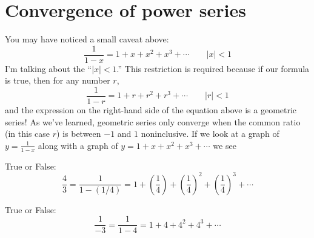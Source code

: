 \documentclass{ximera}
\begin{document}
\section{Convergence of power series}

You may have noticed a small caveat above:
\[
\frac{1}{1-x} = 1+ x+ x^2 + x^3 + \cdots \qquad |x|< 1
\]
I'm talking about the ``$|x|<1$.'' This restriction is required because if
our formula is true, then for any number $r$,
\[
\frac{1}{1-r} = 1+ r+ r^2 + r^3 + \cdots \qquad |r|< 1
\]
and the expression on the right-hand side of the equation above is a
geometric series! As we've learned, geometric
series only converge when the common ratio (in this case $r$) is
between $-1$ and $1$ noninclusive. If we look at a graph of $y = \frac{1}{1-x}$ along with a graph of $y = 1+ x+ x^2 + x^3 + \cdots$ we see
\begin{image}
\end{image}

\begin{question}
  True or False:
  \[
  \frac{4}{3} = \frac{1}{1-(1/4)} = 1 + \left(\frac{1}{4}\right)+ \left(\frac{1}{4}\right)^2+ \left(\frac{1}{4}\right)^3 + \cdots
  \]
  \begin{prompt}
  \begin{multipleChoice}
  \end{multipleChoice}
  \end{prompt}
  \begin{question}
    True or False:
    \[
    \frac{1}{-3} = \frac{1}{1-4} = 1 + 4+ 4^2+ 4^3 + \cdots
    \]
    \begin{prompt}
      \begin{multipleChoice}
      \end{multipleChoice}
    \end{prompt}
\end{question}
\end{question}
\end{document}
